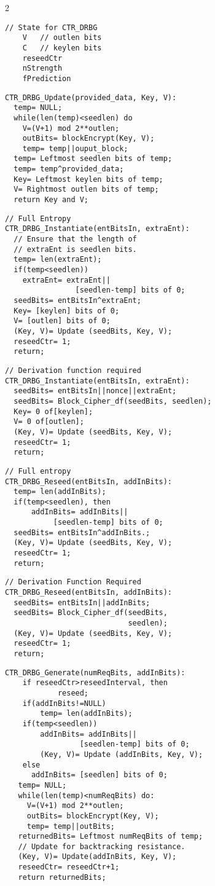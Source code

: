 \begin{multicols} {2}
{\begin{verbatim}
// State for CTR_DRBG
    V	// outlen bits
    C	// keylen bits
    reseedCtr 
    nStrength
    fPrediction
\end{verbatim}

\begin{verbatim}
CTR_DRBG_Update(provided_data, Key, V):
  temp= NULL;
  while(len(temp)<seedlen) do
    V=(V+1) mod 2**outlen;
    outBits= blockEncrypt(Key, V);
    temp= temp||ouput_block;
  temp= Leftmost seedlen bits of temp;
  temp= temp^provided_data;
  Key= Leftmost keylen bits of temp;
  V= Rightmost outlen bits of temp;
  return Key and V;
\end{verbatim}

\begin{verbatim}
// Full Entropy
CTR_DRBG_Instantiate(entBitsIn, extraEnt):
  // Ensure that the length of 
  // extraEnt is seedlen bits. 
  temp= len(extraEnt);
  if(temp<seedlen))
    extraEnt= extraEnt||
                [seedlen-temp] bits of 0;
  seedBits= entBitsIn^extraEnt;
  Key= [keylen] bits of 0;
  V= [outlen] bits of 0;
  (Key, V)= Update (seedBits, Key, V);
  reseedCtr= 1;
  return;
\end{verbatim}

\begin{verbatim}
// Derivation function required
CTR_DRBG_Instantiate(entBitsIn, extraEnt):
  seedBits= entBitsIn||nonce||extraEnt;
  seedBits= Block_Cipher_df(seedBits, seedlen);
  Key= 0 of[keylen];
  V= 0 of[outlen];
  (Key, V)= Update (seedBits, Key, V);
  reseedCtr= 1;
  return;
\end{verbatim}

\begin{verbatim}
// Full entropy
CTR_DRBG_Reseed(entBitsIn, addInBits):
  temp= len(addInBits);
  if(temp<seedlen), then 
      addInBits= addInBits||
           [seedlen-temp] bits of 0;
  seedBits= entBitsIn^addInBits.;
  (Key, V)= Update (seedBits, Key, V);
  reseedCtr= 1;
  return;
\end{verbatim}

\begin{verbatim}
// Derivation Function Required
CTR_DRBG_Reseed(entBitsIn, addInBits):
  seedBits= entBitsIn||addInBits;
  seedBits= Block_Cipher_df(seedBits,
                            seedlen);
  (Key, V)= Update (seedBits, Key, V);
  reseedCtr= 1;
  return;
\end{verbatim}

\begin{verbatim}
CTR_DRBG_Generate(numReqBits, addInBits):
    if reseedCtr>reseedInterval, then 
            reseed;
    if(addInBits!=NULL)
        temp= len(addInBits);
    if(temp<seedlen))
        addInBits= addInBits||
                 [seedlen-temp] bits of 0;
        (Key, V)= Update (addInBits, Key, V);
    else 
      addInBits= [seedlen] bits of 0;
   temp= NULL;
   while(len(temp)<numReqBits) do:
     V=(V+1) mod 2**outlen;
     outBits= blockEncrypt(Key, V);
     temp= temp||outBits;
   returnedBits= Leftmost numReqBits of temp;
   // Update for backtracking resistance.
   (Key, V)= Update(addInBits, Key, V);
   reseedCtr= reseedCtr+1;
   return returnedBits; 
\end{verbatim}

}
\end{multicols}
